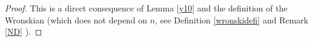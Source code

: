 \documentclass[12pt,oneside,onecolumn,open]{article}
\begin{document}
\begin{proof}
This is a direct consequence of  Lemma \ref{y10} and the definition of the Wronskian (which does not depend on $n$, see Definition \ref{wronskidefi} and Remark \ref{ND} ). 



\end{proof}
\end{document}
